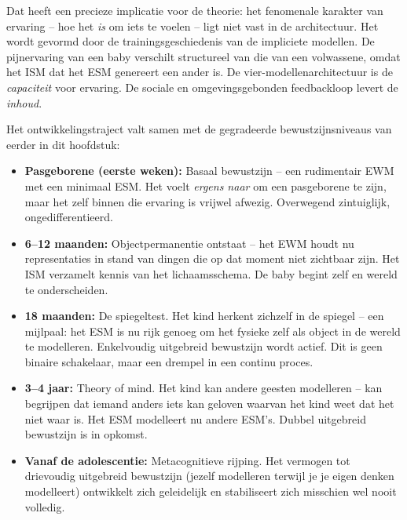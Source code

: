 \documentclass[11pt, twoside, openright]{book}
\begin{document}
Dat heeft een precieze implicatie voor de theorie: het fenomenale karakter van ervaring -- hoe het \textit{is} om iets te voelen -- ligt niet vast in de architectuur. Het wordt gevormd door de trainingsgeschiedenis van de impliciete modellen. De pijnervaring van een baby verschilt structureel van die van een volwassene, omdat het ISM dat het ESM genereert een ander is. De vier-modellenarchitectuur is de \textit{capaciteit} voor ervaring. De sociale en omgevingsgebonden feedbackloop levert de \textit{inhoud}.

Het ontwikkelingstraject valt samen met de gegradeerde bewustzijnsniveaus van eerder in dit hoofdstuk:

\begin{itemize}
  \item \textbf{Pasgeborene (eerste weken):} Basaal bewustzijn -- een rudimentair EWM met een minimaal ESM. Het voelt \textit{ergens naar} om een pasgeborene te zijn, maar het zelf binnen die ervaring is vrijwel afwezig. Overwegend zintuiglijk, ongedifferentieerd.
\end{itemize}

\begin{itemize}
  \item \textbf{6--12 maanden:} Objectpermanentie ontstaat -- het EWM houdt nu representaties in stand van dingen die op dat moment niet zichtbaar zijn. Het ISM verzamelt kennis van het lichaamsschema. De baby begint zelf en wereld te onderscheiden.
\end{itemize}

\begin{itemize}
  \item \textbf{18 maanden:} De spiegeltest. Het kind herkent zichzelf in de spiegel -- een mijlpaal: het ESM is nu rijk genoeg om het fysieke zelf als object in de wereld te modelleren. Enkelvoudig uitgebreid bewustzijn wordt actief. Dit is geen binaire schakelaar, maar een drempel in een continu proces.
\end{itemize}

\begin{itemize}
  \item \textbf{3--4 jaar:} Theory of mind. Het kind kan andere geesten modelleren -- kan begrijpen dat iemand anders iets kan geloven waarvan het kind weet dat het niet waar is. Het ESM modelleert nu andere ESM's. Dubbel uitgebreid bewustzijn is in opkomst.
\end{itemize}

\begin{itemize}
  \item \textbf{Vanaf de adolescentie:} Metacognitieve rijping. Het vermogen tot drievoudig uitgebreid bewustzijn (jezelf modelleren terwijl je je eigen denken modelleert) ontwikkelt zich geleidelijk en stabiliseert zich misschien wel nooit volledig.
\end{itemize}
\end{document}
